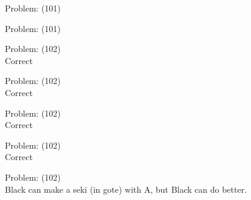 \documentclass[11pt]{article}
\begin{document}
\begin{minipage}[t]{0.5\textwidth}
  {\centering
  
  Problem: (101)\\
  
  }
\end{minipage}
\begin{minipage}[t]{0.5\textwidth}
  {\centering
  
  Problem: (101)\\
  
  }
\end{minipage}
\begin{minipage}[t]{0.5\textwidth}
  {\centering
  
  Problem: (102)\\
  Correct\\
  }
\end{minipage}
\begin{minipage}[t]{0.5\textwidth}
  {\centering
  
  Problem: (102)\\
  Correct\\
  }
\end{minipage}
\begin{minipage}[t]{0.5\textwidth}
  {\centering
  
  Problem: (102)\\
  Correct\\
  }
\end{minipage}
\begin{minipage}[t]{0.5\textwidth}
  {\centering
  
  Problem: (102)\\
  Correct\\
  }
\end{minipage}
\begin{minipage}[t]{0.5\textwidth}
  {\centering
  
  Problem: (102)\\
  Black can make a seki (in gote) with A, but Black can do better.\\
  }
\end{minipage}
\end{document}

